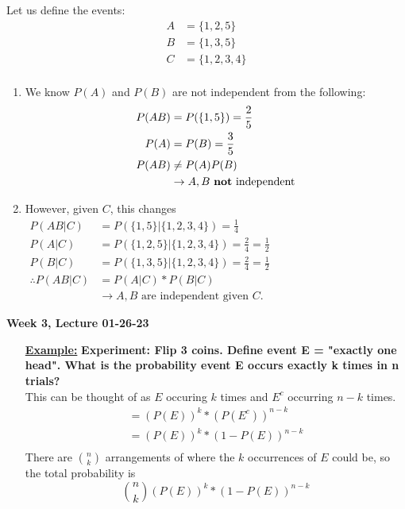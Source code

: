 \documentclass[10pt]{article}
\begin{document}
\begin{flushleft}
\begin{itemize}
            Let us define the events:
        $$ \begin{aligned}
            A &= \{1, 2, 5\} \\
            B &= \{1, 3, 5\} \\
            C &= \{1, 2, 3, 4\} \\
        \end{aligned} $$
        \begin{enumerate}
            \item We know $P(A)$ and $P(B)$ are not independent from the
                following: $$ \begin{aligned}
                    P(AB) &= P(\{1, 5\}) = \frac{2}{5} \\
                    P(A) &= P(B) = \frac{3}{5} \\
                    P(AB) &\neq P(A)P(B) \\
                          &\rightarrow A, B \text{ \textbf{not} independent}
                \end{aligned} $$
            \item However, given $C$, this changes $ \begin{aligned}
                    P(AB|C) &= P(\{1,5\}|\{1,2,3,4\}) = \frac{1}{4} \\
                    P(A|C) &= P(\{1,2,5\}|\{1,2,3,4\}) = \frac{2}{4} =
                    \frac{1}{2} \\
                    P(B|C) &= P(\{1,3,5\}|\{1,2,3,4\}) = \frac{2}{4} =
                    \frac{1}{2} \\
                    \therefore P(AB|C) &= P(A|C) * P(B|C) \\
                                       &\rightarrow A, B \text{ are independent
                                       given }
                                       C.
                \end{aligned} $
        \end{enumerate}
\end{itemize}

\newpage

\begin{center}
	\Large \textbf{Week 3, Lecture 01-26-23}
\end{center}

\begin{itemize}
    \item[\textbf{\underline{Example:}}] \textbf{Experiment: Flip 3 coins.
        Define event E = "exactly one head". What is the probability event E
    occurs exactly k times in n trials?} \\
    This can be thought of as $E$ occuring $k$ times and $E^c$ occurring $n - k$
    times.
    $$ \begin{aligned}
        = (P(E))^k * (P(E^c))^{n-k} \\
        = (P(E))^k * (1 - P(E))^{n-k} \\
    \end{aligned}$$
    There are $\binom{n}{k}$ arrangements of where the $k$ occurrences of $E$
    could be, so the total probability is 
    $$ \binom{n}{k} (P(E))^k * (1 - P(E))^{n-k} $$


\end{itemize}
\end{flushleft}
\end{document}
